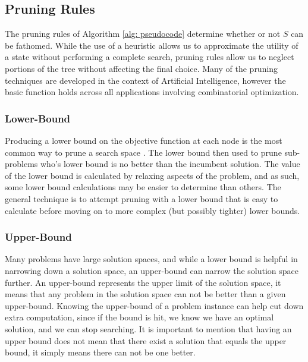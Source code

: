 
\subsection{Pruning Rules}
	The pruning rules of Algorithm \ref{alg: pseudocode} determine whether or not $S$ can be fathomed.
	While the use of a heuristic allows us to approximate the utility of a state without performing a complete search, pruning rules allow us to neglect portions of the tree without affecting the final choice. 
	Many of the pruning techniques are developed in the context of Artificial Intelligence, however the basic function holds across all applications involving combinatorial optimization. 
	\subsubsection{Lower-Bound}
		Producing a lower bound on the objective function at each node is the most common way to prune a search space \cite{morrison2016branch}. 
		The lower bound then used to prune sub-problems who's lower bound is no better than the incumbent solution. 
		The value of the lower bound is calculated by relaxing aspects of the problem, and as such, some lower bound calculations may be easier to determine than others. 
		The general technique is to attempt pruning with a lower bound that is easy to calculate before moving on to more complex (but possibly tighter) lower bounds. 
	\subsubsection{Upper-Bound}
		Many problems have large solution spaces, and while a lower bound is helpful in narrowing
		down a solution space, an upper-bound can narrow the solution space further.
		An upper-bound represents the upper limit of the solution space, it means that any
		problem in the solution space can not be better than a given upper-bound.
		Knowing the upper-bound of a problem instance can help cut down extra computation,
		since if the bound is hit, we know we have an optimal solution, and we can stop
		searching. It is important to mention that having an upper bound does not
		mean that there exist a solution that equals the upper bound, it simply means
		there can not be one better.

		
